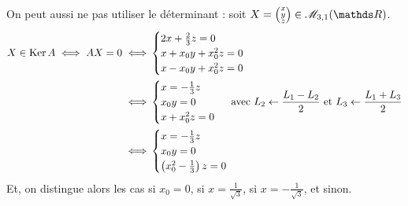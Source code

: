 On peut aussi ne pas utiliser le déterminant : soit $X= \left( \substack{x\\y\\z} \right)\in \mathscr{M}_{3,1}(\R)$.
\begin{align*}
	X \in \operatorname{Ker} A \iff AX = 0 \iff& \begin{cases}
		2x + \frac{2}{3} z = 0\\
		x + x_0y + x_0^2 z = 0\\
		x - x_0y + x_0^2 z = 0
	\end{cases}\\
	\iff& \begin{cases}
			x = -\frac{1}{3} z\\
			x_0 y = 0\\
			x + x_0^2 z = 0
	\end{cases} \text{ avec } L_2 \leftarrow \frac{L_1 - L_2}{2} \text{ et } L_3 \leftarrow \frac{L_1 + L_3}{2}\\
	\iff& \begin{cases}
		x = -\frac{1}{3} z\\
		x_0 y = 0\\
		\left( x_0^2 - \frac{1}{3} \right) z = 0
	\end{cases}
\end{align*}
Et, on distingue alors les cas si $x_0 = 0$, si $x = \frac{1}{\sqrt{3}}$, si $x = -\frac{1}{\sqrt{3}}$, et sinon.

